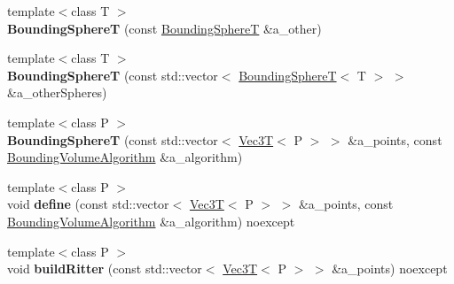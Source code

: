 \begin{DoxyCompactItemize}
\item 
\mbox{\label{classEBGeometry_1_1BoundingVolumes_1_1BoundingSphereT_a7238b291257be347c8dce3213c4e313a}} 
{\footnotesize template$<$class T $>$ }\\{\bfseries Bounding\+SphereT} (const \hyperlink{classEBGeometry_1_1BoundingVolumes_1_1BoundingSphereT}{Bounding\+SphereT} \&a\+\_\+other)
\item 
\mbox{\label{classEBGeometry_1_1BoundingVolumes_1_1BoundingSphereT_aaba73c2b10d4e0b80adc1e16305f87db}} 
{\footnotesize template$<$class T $>$ }\\{\bfseries Bounding\+SphereT} (const std\+::vector$<$ \hyperlink{classEBGeometry_1_1BoundingVolumes_1_1BoundingSphereT}{Bounding\+SphereT}$<$ T $>$ $>$ \&a\+\_\+other\+Spheres)
\item 
\mbox{\label{classEBGeometry_1_1BoundingVolumes_1_1BoundingSphereT_ae7dabdc4c5cf8a82a7dc4f38ffaee132}} 
{\footnotesize template$<$class P $>$ }\\{\bfseries Bounding\+SphereT} (const std\+::vector$<$ \hyperlink{classVec3T}{Vec3T}$<$ P $>$ $>$ \&a\+\_\+points, const \hyperlink{classEBGeometry_1_1BoundingVolumes_1_1BoundingSphereT_ae80a2de96c8230589e4ea05fa9943946}{Bounding\+Volume\+Algorithm} \&a\+\_\+algorithm)
\item 
\mbox{\label{classEBGeometry_1_1BoundingVolumes_1_1BoundingSphereT_a528f18537b4ef853df390e5de06b1b21}} 
{\footnotesize template$<$class P $>$ }\\void {\bfseries define} (const std\+::vector$<$ \hyperlink{classVec3T}{Vec3T}$<$ P $>$ $>$ \&a\+\_\+points, const \hyperlink{classEBGeometry_1_1BoundingVolumes_1_1BoundingSphereT_ae80a2de96c8230589e4ea05fa9943946}{Bounding\+Volume\+Algorithm} \&a\+\_\+algorithm) noexcept
\item 
\mbox{\label{classEBGeometry_1_1BoundingVolumes_1_1BoundingSphereT_a270720886cb098e072173dd25262135f}} 
{\footnotesize template$<$class P $>$ }\\void {\bfseries build\+Ritter} (const std\+::vector$<$ \hyperlink{classVec3T}{Vec3T}$<$ P $>$ $>$ \&a\+\_\+points) noexcept
\end{DoxyCompactItemize}
